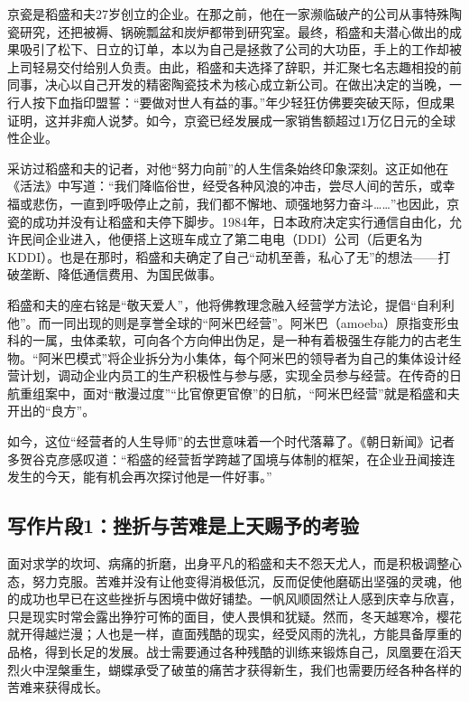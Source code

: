 京瓷是稻盛和夫27岁创立的企业。在那之前，他在一家濒临破产的公司从事特殊陶瓷研究，还把被褥、锅碗瓢盆和炭炉都带到研究室。最终，稻盛和夫潜心做出的成果吸引了松下、日立的订单，本以为自己是拯救了公司的大功臣，手上的工作却被上司轻易交付给别人负责。由此，稻盛和夫选择了辞职，并汇聚七名志趣相投的前同事，决心以自己开发的精密陶瓷技术为核心成立新公司。在做出决定的当晚，一行人按下血指印盟誓：“要做对世人有益的事。”年少轻狂仿佛要突破天际，但成果证明，这并非痴人说梦。如今，京瓷已经发展成一家销售额超过1万亿日元的全球性企业。

采访过稻盛和夫的记者，对他“努力向前”的人生信条始终印象深刻。这正如他在《活法》中写道：“我们降临俗世，经受各种风浪的冲击，尝尽人间的苦乐，或幸福或悲伤，一直到呼吸停止之前，我们都不懈地、顽强地努力奋斗……”也因此，京瓷的成功并没有让稻盛和夫停下脚步。1984年，日本政府决定实行通信自由化，允许民间企业进入，他便搭上这班车成立了第二电电（DDI）公司（后更名为KDDI）。也是在那时，稻盛和夫确定了自己“动机至善，私心了无”的想法——打破垄断、降低通信费用、为国民做事。

稻盛和夫的座右铭是“敬天爱人”，他将佛教理念融入经营学方法论，提倡“自利利他”。而一同出现的则是享誉全球的“阿米巴经营”。阿米巴（amoeba）原指变形虫科的一属，虫体柔软，可向各个方向伸出伪足，是一种有着极强生存能力的古老生物。“阿米巴模式”将企业拆分为小集体，每个阿米巴的领导者为自己的集体设计经营计划，调动企业内员工的生产积极性与参与感，实现全员参与经营。在传奇的日航重组案中，面对“散漫过度”“比官僚更官僚”的日航，“阿米巴经营”就是稻盛和夫开出的“良方”。

如今，这位“经营者的人生导师”的去世意味着一个时代落幕了。《朝日新闻》记者多贺谷克彦感叹道：“稻盛的经营哲学跨越了国境与体制的框架，在企业丑闻接连发生的今天，能有机会再次探讨他是一件好事。”

\subsection*{写作片段1：挫折与苦难是上天赐予的考验}

面对求学的坎坷、病痛的折磨，出身平凡的稻盛和夫不怨天尤人，而是积极调整心态，努力克服。苦难并没有让他变得消极低沉，反而促使他磨砺出坚强的灵魂，他的成功也早已在这些挫折与困境中做好铺垫。一帆风顺固然让人感到庆幸与欣喜，只是现实时常会露出狰狞可怖的面目，使人畏惧和犹疑。然而，冬天越寒冷，樱花就开得越烂漫；人也是一样，直面残酷的现实，经受风雨的洗礼，方能具备厚重的品格，得到长足的发展。战士需要通过各种残酷的训练来锻炼自己，凤凰要在滔天烈火中涅槃重生，蝴蝶承受了破茧的痛苦才获得新生，我们也需要历经各种各样的苦难来获得成长。

